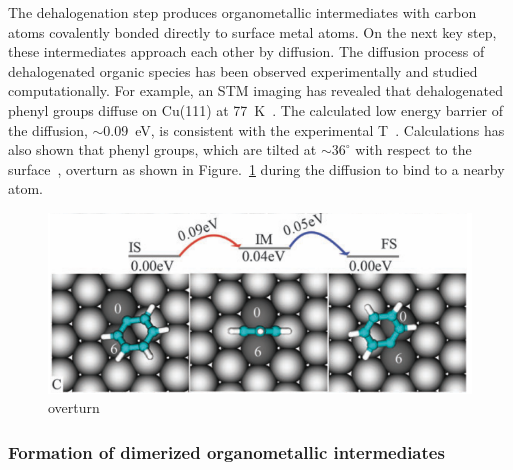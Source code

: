 \documentclass[aps,reprint,amsmath,amssymb]{revtex4-2}
\begin{document}
The dehalogenation step produces organometallic intermediates with carbon atoms covalently bonded directly to surface metal atoms. On the next key step, these intermediates approach each other by diffusion. 
%
The diffusion process of dehalogenated organic species has been observed experimentally and studied computationally. For example, an STM imaging has revealed that dehalogenated phenyl groups diffuse on Cu(111) at 77~K~\cite{langm01}. The calculated low energy barrier of the diffusion, $\sim$0.09~eV, is consistent with the experimental T~\cite{RZK-same-article?}. Calculations has also shown that phenyl groups, which are tilted at $\sim 36^\circ$ with respect to the surface~\cite{pccp2010}, overturn as shown in Figure.~\ref{fig:4} during the diffusion to bind to a nearby atom. 


\begin{figure}[htb]
\centering
\includegraphics[width=0.98\columnwidth]{Fig/overturn.png}
\caption{overturn} %
\label{fig:4}
\end{figure}




\subsubsection{Formation of dimerized organometallic intermediates}
\end{document}
